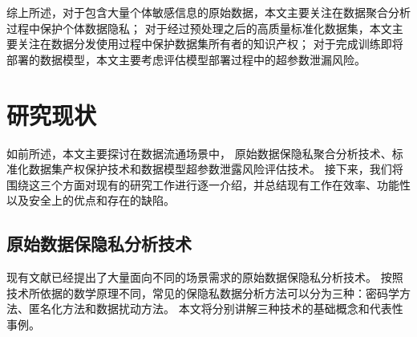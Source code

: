 综上所述，对于包含大量个体敏感信息的原始数据，本文主要关注在数据聚合分析过程中保护个体数据隐私；
对于经过预处理之后的高质量标准化数据集，本文主要关注在数据分发使用过程中保护数据集所有者的知识产权；
对于完成训练即将部署的数据模型，本文主要考虑评估模型部署过程中的超参数泄漏风险。

\section{研究现状}
如前所述，本文主要探讨在数据流通场景中，
原始数据保隐私聚合分析技术、标准化数据集产权保护技术和数据模型超参数泄露风险评估技术。
接下来，我们将围绕这三个方面对现有的研究工作进行逐一介绍，并总结现有工作在效率、功能性以及安全上的优点和存在的缺陷。

\subsection{原始数据保隐私分析技术}
现有文献已经提出了大量面向不同的场景需求的原始数据保隐私分析技术。
按照技术所依据的数学原理不同，常见的保隐私数据分析方法可以分为三种：密码学方法、匿名化方法和数据扰动方法。
本文将分别讲解三种技术的基础概念和代表性事例。

